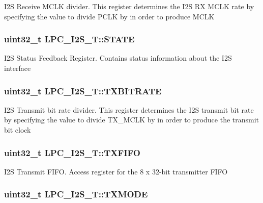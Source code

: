 I2\-S Receive M\-C\-L\-K divider. This register determines the I2\-S R\-X M\-C\-L\-K rate by specifying the value to divide P\-C\-L\-K by in order to produce M\-C\-L\-K \hypertarget{structLPC__I2S__T_a35299409c86d4860e936a7ff3e5603bf}{
\subsubsection[{S\-T\-A\-T\-E}]{ uint32\-\_\-t L\-P\-C\-\_\-\-I2\-S\-\_\-\-T\-::\-S\-T\-A\-T\-E}}\label{structLPC__I2S__T_a35299409c86d4860e936a7ff3e5603bf}
I2\-S Status Feedback Register. Contains status information about the I2\-S interface \hypertarget{structLPC__I2S__T_a16c60f11507aee3e4aef26c365a02ce2}{
\subsubsection[{T\-X\-B\-I\-T\-R\-A\-T\-E}]{ uint32\-\_\-t L\-P\-C\-\_\-\-I2\-S\-\_\-\-T\-::\-T\-X\-B\-I\-T\-R\-A\-T\-E}}\label{structLPC__I2S__T_a16c60f11507aee3e4aef26c365a02ce2}
I2\-S Transmit bit rate divider. This register determines the I2\-S transmit bit rate by specifying the value to divide T\-X\-\_\-\-M\-C\-L\-K by in order to produce the transmit bit clock \hypertarget{structLPC__I2S__T_aa3a381d218c4342917885fa3a51e82d8}{
\subsubsection[{T\-X\-F\-I\-F\-O}]{ uint32\-\_\-t L\-P\-C\-\_\-\-I2\-S\-\_\-\-T\-::\-T\-X\-F\-I\-F\-O}}\label{structLPC__I2S__T_aa3a381d218c4342917885fa3a51e82d8}
I2\-S Transmit F\-I\-F\-O. Access register for the 8 x 32-\/bit transmitter F\-I\-F\-O \hypertarget{structLPC__I2S__T_a30384953ab71a349e60ed555b4ec4552}{
\subsubsection[{T\-X\-M\-O\-D\-E}]{ uint32\-\_\-t L\-P\-C\-\_\-\-I2\-S\-\_\-\-T\-::\-T\-X\-M\-O\-D\-E}}\label{structLPC__I2S__T_a30384953ab71a349e60ed555b4ec4552}
